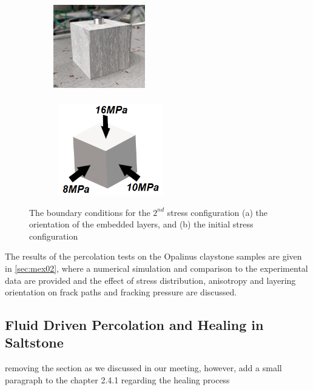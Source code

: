 \begin{figure}[!ht]
\begin{subfigure}[c]{0.48\textwidth}
\includegraphics[width=4cm,height=4cm]{figures/Amir_Percolation_Orientation2.png}
\subcaption{}
\label{fig:Amir_Percolation_Orientation2}
\end{subfigure}
\hfill
\begin{subfigure}[c]{0.48\textwidth}
\includegraphics[width=5cm,height=4cm]{figures/Amir_Percolation_Stress_2.png}
\subcaption{}
\label{fig:Amir_Percolation_Stress_2}
\end{subfigure}
\caption{The boundary conditions for the $2^{nd}$ stress configuration  (a) the orientation of the embedded layers, and (b) the initial stress configuration}
\end{figure}

The results of the percolation tests on the Opalinus claystone samples are given in \ref{sec:mex02}, where a numerical simulation and comparison to the experimental data are provided and the effect of stress distribution, anisotropy and layering orientation on frack paths and fracking pressure are discussed. 


\subsection{Fluid Driven Percolation and Healing in Saltstone}

 removing the section as we discussed in our meeting, however, add a small paragraph to the chapter 2.4.1 regarding the healing process

